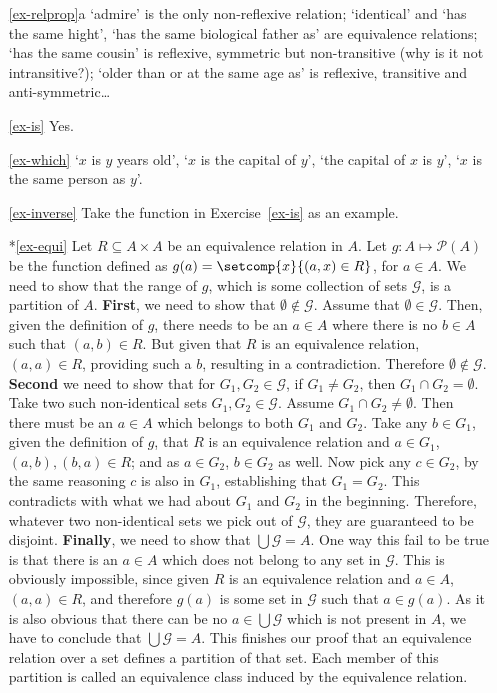 \documentclass[11pt]{article}
\begin{document}
\begin{enumerate}
\item[\ref{ex-relprop}a] `admire' is the only non-reflexive relation; `identical'
and `has the same hight', `has the same biological father as'  are equivalence
relations; `has the same cousin' is reflexive, symmetric but non-transitive (why
is it not intransitive?); `older than or at the same age as' is reflexive,
transitive and anti-symmetric\ldots

\item[\ref{ex-is}] Yes.

\item[\ref{ex-which}]
 `$x$ is $y$ years old',
`$x$ is the capital of $y$', `the capital  of $x$ is $y$', `$x$ is the same person as $y$'.


\item[\ref{ex-inverse}] Take the function in Exercise~\ref{ex-is} as an example.

\item[*\ref{ex-equi}] Let $R\subseteq A\times A$ be an equivalence relation in
$A$. Let $g: A \mapsto \mathcal{P}(A)$ be the function defined as $g(a) =
\setcomp{x}{(a,x) \in R}$, for $a\in A$. We need to show that the range of $g$,
which is some collection of sets $\mathcal{G}$, is a partition of $A$. {\bf
First}, we need to show that $\emptyset \not\in \mathcal{G}$. Assume that
$\emptyset \in \mathcal{G}$. Then, given the definition of $g$, there needs to
be an $a \in A$ where there is no $b \in A$ such that $(a,b) \in R$. But given
that $R$ is an equivalence relation, $(a,a) \in R$, providing such a $b$,
resulting in a contradiction. Therefore  $\emptyset \not\in \mathcal{G}$. {\bf
Second} we need to show that for $G_1, G_2 \in \mathcal{G}$, if $G_1 \neq G_2$,
then $G_1\cap G_2 = \emptyset$. Take two such non-identical sets $G_1, G_2 \in
\mathcal{G}$. Assume $G_1\cap G_2 \neq \emptyset$. Then there must be an $a \in
A$ which belongs to both $G_1$ and $G_2$. Take any $b \in G_1$, given the
definition of $g$,  that $R$ is an equivalence relation and $a\in G_1$, $(a,b),
(b,a) \in R$; and as $a \in G_2$, $b\in G_2$ as well. Now pick any $c\in G_2$,
by the same reasoning $c$ is also in $G_1$, establishing that $G_1 = G_2$. This
contradicts with what we had about $G_1$ and $G_2$ in the beginning. Therefore,
whatever two non-identical sets we pick out of $\mathcal{G}$, they are
guaranteed to be disjoint. {\bf Finally}, we need to show that $\bigcup
\mathcal{G} = A$. One way this fail to be true is that  there is an $a\in A$ which does
not belong to any set in $\mathcal{G}$. This is obviously impossible, since
given $R$ is an equivalence relation and $a\in A$, $(a,a) \in R$, and therefore
$g(a)$ is some set in $\mathcal{G}$ such that $a \in g(a)$. As it is also
obvious that there can be no $a \in \bigcup\mathcal{G}$ which is not present in
$A$, we have to conclude that $\bigcup
\mathcal{G} = A$. This finishes our proof that an equivalence relation over a
set defines a partition of that set. Each member of this partition is called an
equivalence class induced by the equivalence relation. 

\end{enumerate}




\end{document}
